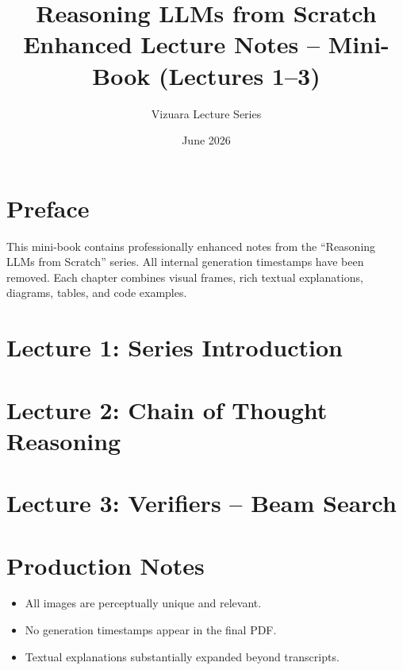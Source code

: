 \documentclass[11pt,a4paper]{report}
\title{\textbf{Reasoning LLMs from Scratch}\\[0.5em]
\large Enhanced Lecture Notes -- Mini-Book (Lectures 1--3)}
\author{Vizuara Lecture Series}
\date{June 2026}
\begin{document}
\maketitle
\tableofcontents

\chapter*{Preface}
This mini-book contains professionally enhanced notes from the ``Reasoning LLMs from Scratch'' series. All internal generation timestamps have been removed. Each chapter combines visual frames, rich textual explanations, diagrams, tables, and code examples.

\chapter{Lecture 1: Series Introduction}


\chapter{Lecture 2: Chain of Thought Reasoning}


\chapter{Lecture 3: Verifiers -- Beam Search}


\appendix
\chapter{Production Notes}
\begin{itemize}
    \item All images are perceptually unique and relevant.
    \item No generation timestamps appear in the final PDF.
    \item Textual explanations substantially expanded beyond transcripts.
\end{itemize}
\end{document}
